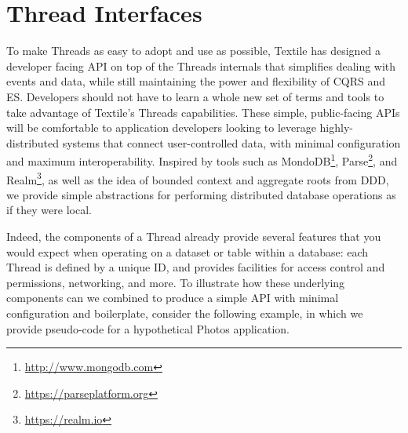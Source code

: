 \documentclass{textile}
\begin{document}



\section{Thread Interfaces}\label{sec:interfaces}

To make Threads as easy to adopt and use as possible, Textile has designed a developer facing API on top of the Threads internals that simplifies dealing with events and data, while still maintaining the power and flexibility of CQRS and ES. Developers should not have to learn a whole new set of terms and tools to take advantage of Textile's Threads capabilities. These simple, public-facing APIs will be comfortable to application developers looking to leverage highly-distributed systems that connect user-controlled data, with minimal configuration and maximum interoperability. Inspired by tools such as MondoDB\footnote{\url{http://www.mongodb.com}}, Parse\footnote{\url{https://parseplatform.org}}, and Realm\footnote{\url{https://realm.io}}, as well as the idea of bounded context and aggregate roots from DDD, we provide simple abstractions for performing distributed database operations as if they were local.

Indeed, the components of a Thread already provide several features that you would expect when operating on a dataset or table within a database: each Thread is defined by a unique ID, and provides facilities for access control and permissions, networking, and more. To illustrate how these underlying components can we combined to produce a simple API with minimal configuration and boilerplate, consider the following example, in which we provide pseudo-code for a hypothetical Photos application.
\end{document}
